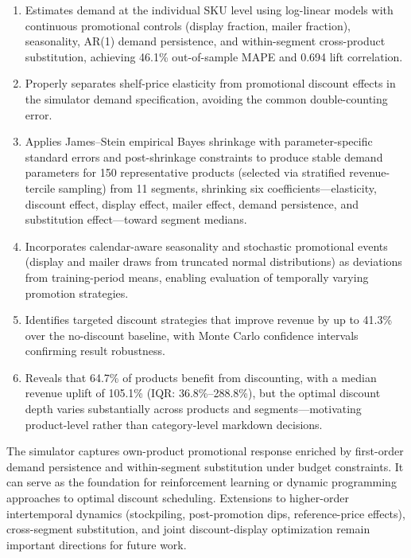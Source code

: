 \documentclass[12pt,a4paper]{article}
\begin{document}
\begin{enumerate}[nosep]
\item Estimates demand at the individual SKU level using log-linear
models with continuous promotional controls (display fraction,
mailer fraction), seasonality, AR(1) demand persistence, and
within-segment cross-product substitution, achieving 46.1\%
out-of-sample MAPE and 0.694 lift correlation.

\item Properly separates shelf-price elasticity from promotional
discount effects in the simulator demand specification, avoiding
the common double-counting error.

\item Applies James--Stein empirical Bayes shrinkage with
parameter-specific standard errors and post-shrinkage constraints
to produce stable demand parameters for 150 representative
products (selected via stratified revenue-tercile sampling) from
11 segments, shrinking six coefficients---elasticity, discount
effect, display effect, mailer effect, demand persistence, and
substitution effect---toward segment medians.

\item Incorporates calendar-aware seasonality and stochastic
promotional events (display and mailer draws from truncated normal
distributions) as deviations from training-period means, enabling
evaluation of temporally varying promotion strategies.

\item Identifies targeted discount strategies that improve revenue by
up to 41.3\% over the no-discount baseline, with Monte Carlo
confidence intervals confirming result robustness.

\item Reveals that 64.7\% of products benefit from discounting, with
a median revenue uplift of 105.1\% (IQR: 36.8\%--288.8\%),
but the optimal discount depth varies substantially across products
and segments---motivating product-level rather than category-level
markdown decisions.
\end{enumerate}

The simulator captures own-product promotional response enriched by
first-order demand persistence and within-segment substitution under
budget constraints. It can serve as the foundation for reinforcement
learning or dynamic programming approaches to optimal discount
scheduling. Extensions to higher-order intertemporal dynamics
(stockpiling, post-promotion dips, reference-price effects),
cross-segment substitution, and joint discount-display optimization
remain important directions for future work.
\end{document}
